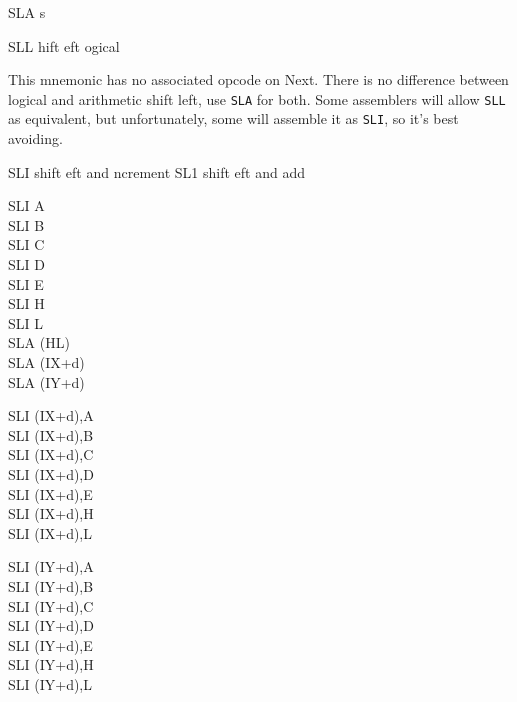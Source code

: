 \begin{basedescript}{
	\desclabelstyle{\multilinelabel}
	\desclabelwidth{3cm}}
\begin{DetailItem}{SLA s}
		\begin{DetailTiming}
		\end{DetailTiming}

	\end{DetailItem}

	\begin{DetailItem}{SLL}
		{hift \IH{L}eft ogical}
		{}

		This mnemonic has no associated opcode on Next. There is no difference between logical and arithmetic shift left, use {\tt SLA} for both. Some assemblers will allow {\tt SLL} as equivalent, but unfortunately, some will assemble it as {\tt SLI}, so it's best avoiding.
		
	\end{DetailItem}

	\pagebreak
	\begin{DetailItemMultiline}
		{SLI s\UNDOC}{hift eft and ncrement}
		{SL1 s\UNDOC}{hift eft and add }
		{}
		
		\begin{DetailVariants}
			SLI A\\
			SLI B\\
			SLI C\\
			SLI D\\
			SLI E\\
			SLI H\\
			SLI L\\
			SLA (HL)\\
			SLA (IX+d)\\
			SLA (IY+d)

			\columnbreak
			SLI (IX+d),A\UNDOC\\
			SLI (IX+d),B\UNDOC\\
			SLI (IX+d),C\UNDOC\\
			SLI (IX+d),D\UNDOC\\
			SLI (IX+d),E\UNDOC\\
			SLI (IX+d),H\UNDOC\\
			SLI (IX+d),L\UNDOC

			\columnbreak
			SLI (IY+d),A\UNDOC\\
			SLI (IY+d),B\UNDOC\\
			SLI (IY+d),C\UNDOC\\
			SLI (IY+d),D\UNDOC\\
			SLI (IY+d),E\UNDOC\\
			SLI (IY+d),H\UNDOC\\
			SLI (IY+d),L\UNDOC
		\end{DetailVariants}


\end{DetailItemMultiline}
\end{basedescript}

